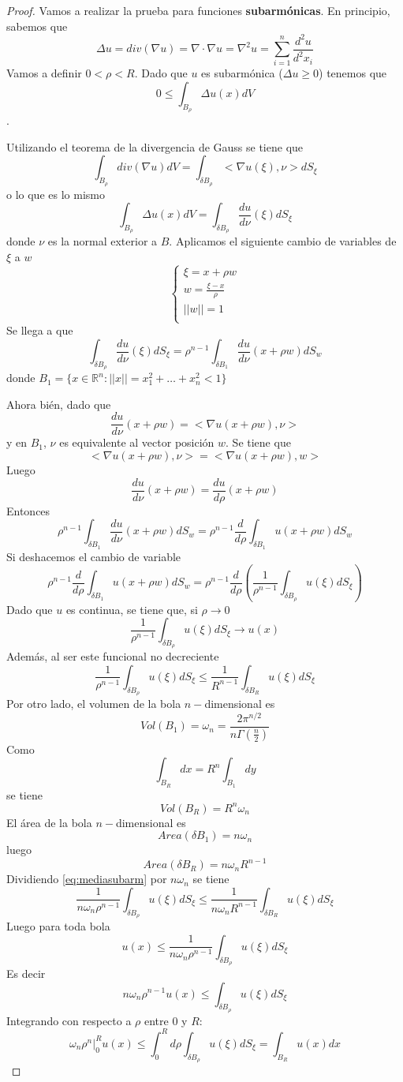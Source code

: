 \begin{proof}
Vamos a realizar la prueba para funciones \textbf{subarmónicas}. En principio, sabemos que 
$$\Delta u = div(\nabla u) = \nabla\cdot\nabla u = \nabla^2 u = \sum_{i=1}^n \frac{d^2u}{d^2x_i}$$
Vamos a definir $0<\rho<R$. Dado que $u$ es subarmónica ($\Delta u \ge 0$) tenemos que 
$$0 \le \int_{B_\rho}\Delta u(x) dV$$.

Utilizando el teorema de la divergencia de Gauss se tiene que 
$$\int_{B_\rho} div(\nabla u)dV = \int_{\delta B_\rho}<\nabla u(\xi), \nu>dS_\xi$$
o lo que es lo mismo
$$\int_{B_\rho}\Delta u(x) dV = \int_{\delta B_\rho}\frac{du}{d\nu}(\xi)dS_\xi$$
donde $\nu$ es la normal exterior a $B$.
Aplicamos el siguiente cambio de variables de $\xi$ a $w$
\begin{equation*}
\left\{
\begin{array}{l}
\xi = x+\rho w\\
w = \frac{\xi-x}{\rho}\\
||w|| = 1\\
\end{array}
\right.
\end{equation*}
Se llega a que
$$\int_{\delta B_\rho}\frac{du}{d\nu}(\xi)dS_\xi = \rho^{n-1}\int_{\delta B_1}\frac{du}{d\nu}(x+\rho w)dS_w$$
donde $B_1 = \{x\in\mathbb{R}^n: ||x|| = x_1^2+\hdots+x_n^2 < 1\}$

\noindent Ahora bién, dado que $$\frac{du}{d\nu}(x+\rho w) = <\nabla u(x+\rho w), \nu>$$ y en $B_1$, $\nu$ es equivalente al vector posición $w$. Se tiene que $$<\nabla u(x+\rho w), \nu> = <\nabla u(x+\rho w), w>$$
Luego $$\frac{du}{d\nu}(x+\rho w) = \frac{du}{d\rho}(x+\rho w)$$
Entonces
$$ \rho^{n-1}\int_{\delta B_1}\frac{du}{d\nu}(x+\rho w)dS_w  =  \rho^{n-1}\frac{d}{d\rho}\int_{\delta B_1}u(x+\rho w)dS_w$$
Si deshacemos el cambio de variable
$$\rho^{n-1}\frac{d}{d\rho}\int_{\delta B_1}u(x+\rho w)dS_w = \rho^{n-1}\frac{d}{d\rho}\left(\frac{1}{\rho^{n-1}}\int_{\delta B_\rho}u(\xi)dS_\xi\right)$$
Dado que $u$ es continua, se tiene que, si $\rho\to0$
$$\frac{1}{\rho^{n-1}}\int_{\delta B_\rho}u(\xi)dS_\xi\longrightarrow u(x)$$
Además, al ser este funcional no decreciente
\begin{equation}\label{eq:mediasubarm}
\frac{1}{\rho^{n-1}}\int_{\delta B_\rho}u(\xi)dS_\xi \le \frac{1}{R^{n-1}}\int_{\delta B_R}u(\xi)dS_\xi
\end{equation}
Por otro lado, el volumen de la bola $n-$dimensional es
$$Vol(B_1) = \omega_n = \frac{2\pi^{n/2}}{n\Gamma(\frac{n}{2})}$$
Como $$\int_{B_R}dx = R^n\int_{B_1}dy$$
se tiene $$Vol(B_R) = R^n\omega_n$$
El área de la bola $n-$dimensional es
$$Area(\delta B_1) = n\omega_n$$
luego
$$Area(\delta B_R) = n\omega_nR^{n-1}$$
Dividiendo \eqref{eq:mediasubarm} por $n\omega_n$ se tiene 
$$\frac{1}{n\omega_n\rho^{n-1}}\int_{\delta B_\rho}u(\xi)dS_\xi \le \frac{1}{n\omega_nR^{n-1}}\int_{\delta B_R}u(\xi)dS_\xi$$
Luego para toda bola
$$u(x) \le \frac{1}{n\omega_n\rho^{n-1}}\int_{\delta B_\rho}u(\xi)dS_\xi$$
Es decir
$$n\omega_n\rho^{n-1}u(x) \le \int_{\delta B_\rho}u(\xi)dS_\xi$$
Integrando con respecto a $\rho$ entre $0$ y $R$:
$$\omega_n\left.\rho^n\right|_0^R u(x) \le \int_0^Rd\rho\int_{\delta B_\rho}u(\xi)dS_\xi = \int_{B_R}u(x)dx$$
\end{proof}


